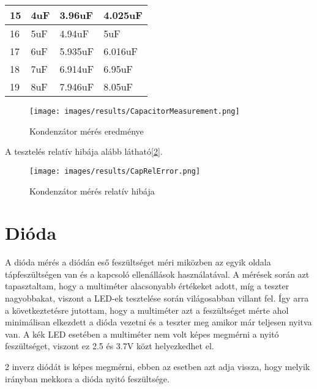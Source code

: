 \begin{table}[H]
\begin{tabular}{|l|l|l|l|}
    15      & 4uF            & 3.96uF                   & 4.025uF    \\ \hline
    16      & 5uF            & 4.94uF                   & 5uF        \\ \hline
    17      & 6uF            & 5.935uF                  & 6.016uF    \\ \hline
    18      & 7uF            & 6.914uF                  & 6.95uF     \\ \hline
    19      & 8uF            & 7.946uF                  & 8.05uF     \\ \hline
    \end{tabular}
    \end{table}

    \begin{figure}[H]
        \centering
        \texttt{[image: images/results/CapacitorMeasurement.png]}
        \caption{Kondenzátor mérés eredménye}
        \label{fig:CapacitorResults}
    \end{figure}

    A tesztelés relatív hibája alább látható[\ref{fig:CapRelErrorResults}].

    \begin{figure}[H]
        \centering
        \texttt{[image: images/results/CapRelError.png]}
        \caption{Kondenzátor mérés relatív hibája}
        \label{fig:CapRelErrorResults}
    \end{figure}

\section{Dióda}

A dióda mérés a diódán eső feszültséget méri miközben az egyik oldala
tápfeszültségen van és a kapcsoló ellenállások használatával.
A mérések során azt tapasztaltam, hogy a multiméter alacsonyabb
értékeket adott, míg a teszter nagyobbakat, viszont a LED-ek
tesztelése során világosabban villant fel. Így arra a következtetésre
jutottam, hogy a multiméter azt a feszültséget mérte ahol
minimálisan elkezdett a dióda vezetni és a teszter meg amikor
már teljesen nyitva van. A kék LED esetében a multiméter nem volt képes
megmérni a nyitó feszültséget, viszont ez 2.5 és 3.7V közt helyezkedhet el.

2 inverz diódát is képes megmérni, ebben az esetben azt adja vissza, hogy melyik
irányban mekkora a dióda nyitó feszültsége.

